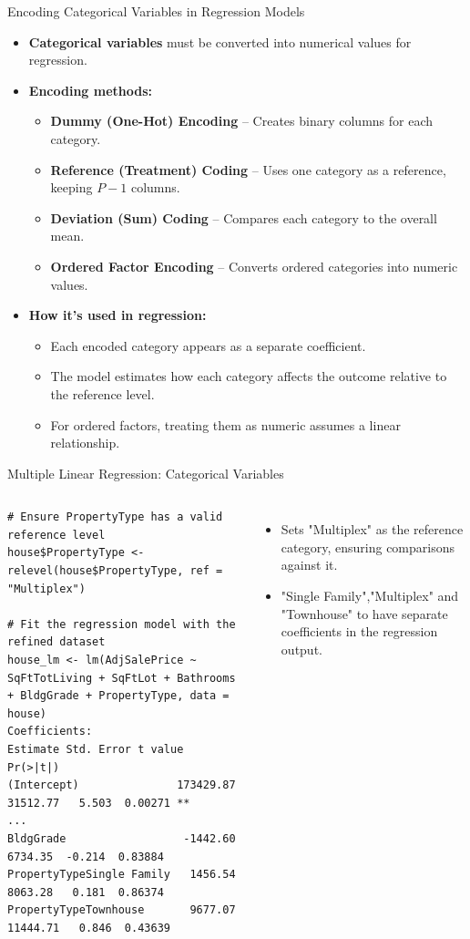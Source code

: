 \documentclass{beamer}
\begin{document}
	
	\begin{frame}{Encoding Categorical Variables in Regression Models}
		\begin{itemize}
			\item \textbf{Categorical variables} must be converted into numerical values for regression.
			\item \textbf{Encoding methods:}
			\begin{itemize}
				\item \textbf{Dummy (One-Hot) Encoding} – Creates binary columns for each category.
				\item \textbf{Reference (Treatment) Coding} – Uses one category as a reference, keeping $P - 1$ columns.
				\item \textbf{Deviation (Sum) Coding} – Compares each category to the overall mean.
				\item \textbf{Ordered Factor Encoding} – Converts ordered categories into numeric values.
			\end{itemize}
			\item \textbf{How it’s used in regression:}
			\begin{itemize}
				\item Each encoded category appears as a separate coefficient.
				\item The model estimates how each category affects the outcome relative to the reference level.
				\item For ordered factors, treating them as numeric assumes a linear relationship.
			\end{itemize}
		\end{itemize}
	\end{frame}
	

	\begin{frame}[fragile]{Multiple Linear Regression: Categorical Variables}
		\begin{columns}
			\begin{lstlisting}
# Ensure PropertyType has a valid reference level
house$PropertyType <- relevel(house$PropertyType, ref = "Multiplex")

# Fit the regression model with the refined dataset
house_lm <- lm(AdjSalePrice ~ SqFtTotLiving + SqFtLot + Bathrooms + BldgGrade + PropertyType, data = house)
Coefficients:
Estimate Std. Error t value Pr(>|t|)   
(Intercept)               173429.87   31512.77   5.503  0.00271 **
...
BldgGrade                  -1442.60    6734.35  -0.214  0.83884   
PropertyTypeSingle Family   1456.54    8063.28   0.181  0.86374   
PropertyTypeTownhouse       9677.07   11444.71   0.846  0.43639 
			\end{lstlisting}
			\begin{itemize}
				\item Sets "Multiplex" as the reference category, ensuring comparisons against it.
				\item "Single Family","Multiplex" and "Townhouse" to have separate coefficients in the regression output.
			\end{itemize}
		\end{columns}
	\end{frame}
	
\end{document}
